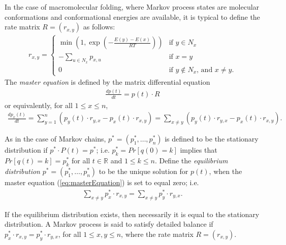In the case of macromolecular folding, where Markov process states
are molecular conformations and conformational energies are available,
it is typical to define the rate matrix
$R = (r_{x,y})$ as follows:
\begin{eqnarray}
\label{eq:transitionProb2}
r_{x,y} = \left\{
\begin{array}{ll}
\min\left(1,\exp(-\frac{E(y)-E(x)}{RT})\right)
&\mbox{if $y \in N_x$}\\
- \sum_{u \in N_x} p_{x,u} &\mbox{if $x=y$}\\
0 &\mbox{if $y \not\in N_x$, and $x \ne y$}.
\end{array} \right.
\end{eqnarray}
The {\em master equation} is defined by the matrix differential equation
\begin{eqnarray}
\label{eq:masterEquationMatrix}
\frac{d p(t)}{dt} = p(t) \cdot R
\end{eqnarray}
or equivalently, for all $1 \leq x \leq n$,
\begin{eqnarray}
\label{eq:masterEquation}
\frac{d p_x(t)}{dt} = \sum_{y=1}^n (p_y(t) \cdot r_{y,x} - p_x(t) \cdot r_{x,y})
  = \sum_{x \ne y} (p_y(t) \cdot r_{y,x} - p_x(t) \cdot r_{x,y}) .
\end{eqnarray}

As in the case of Markov chains,
$p^* = (p^*_1,\ldots,p^*_n)$ is defined to be
the stationary distribution if
$p^* \cdot P(t)= p^*$; i.e.  $p^*_k = Pr[ q(0) = k ]$ implies that
$Pr[ q(t) = k] = p^*_k$ for all $t \in \mathbb{R}$ and
$1 \leq k \leq n$.
Define the {\em equilibrium distribution} $p^* = (p^*_1,\ldots,p^*_n)$
to be the unique solution for $p(t)$, when the master equation
(\ref{eq:masterEquation}) is set to equal zero; i.e.
\begin{eqnarray}
\label{eq:equilibriumTime}
\sum_{x \ne y} p^*_x \cdot r_{x,y} = \sum_{x \ne y} p^*_y \cdot r_{y,x}.
\end{eqnarray}

If the equilibrium distribution exists, then necessarily it is equal to
the stationary distribution. A Markov process is said
to satisfy detailed balance if $p^*_x \cdot r_{x,y} = p^*_y \cdot r_{y,x}$,
for all $1 \leq x,y \leq n$, where the rate matrix $R = (r_{x,y})$.

